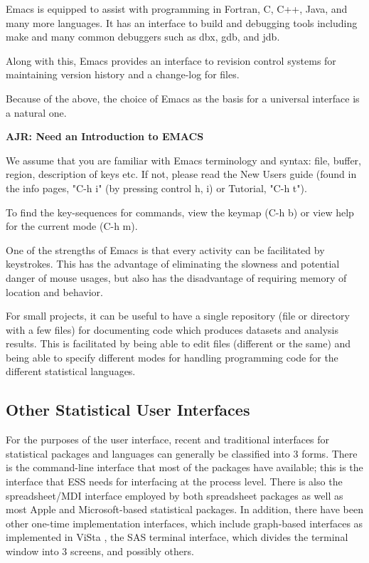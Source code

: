 \documentclass{article}
\begin{document}
Emacs is equipped to assist with programming in Fortran, C, C++, Java,
and many more languages.  It has an interface to build and debugging
tools including make and many common debuggers such as dbx, gdb, and
jdb. 

Along with this, Emacs provides an interface to revision control
systems for maintaining version history and a change-log for files.

Because of the above, the choice of Emacs as the basis for a universal
interface is a natural one.  

\textbf{AJR: Need an Introduction to EMACS}

We assume that you are familiar with Emacs terminology and syntax:
file, buffer, region, description of keys etc.  If not, please read
the New Users guide (found in the info pages, "C-h i" (by pressing
control h, i) or Tutorial, "C-h t").

To find the key-sequences for commands, view the keymap (C-h b) or
view help for the current mode (C-h m).  

One of the strengths of Emacs is that every activity can be
facilitated by keystrokes.  This has the advantage of eliminating the
slowness and potential danger of mouse usages, but also has the
disadvantage of requiring memory of location and behavior.


For small projects, it can be useful to have a single repository (file
or directory with a few files) for documenting code which produces
datasets and analysis results.  This is facilitated by being able to
edit files (different or the same) and being able to specify different
modes for handling programming code for the different statistical
languages.

\subsection{Other Statistical User Interfaces}
\label{sec:intro:UI}

For the purposes of the user interface, recent and traditional
interfaces for statistical packages and languages can generally be
classified into 3 forms.  There is the command-line interface that
most of the packages have available; this is the interface that ESS
needs for interfacing at the process level.  There is also the
spreadsheet/MDI interface employed by both spreadsheet packages as
well as most Apple and Microsoft-based statistical packages.  In
addition, there have been other one-time implementation interfaces,
which include graph-based interfaces as implemented in ViSta
\citep{youn:lubi:1995}, the SAS terminal interface, which divides the
terminal window into 3 screens, and possibly others.
\end{document}

